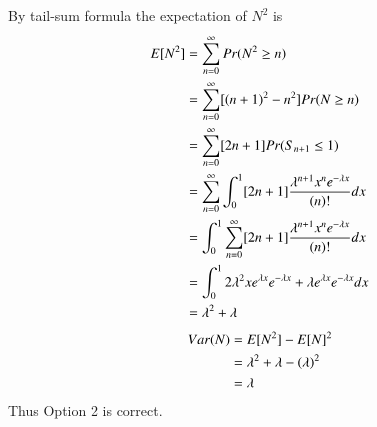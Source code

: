 \documentclass[journal,12pt,twocolumn]{IEEEtran}
\theoremstyle{definition}
\begin{document}
By tail-sum formula the expectation of $N^2$ is\\
\begin{align}
    E[ N^2 ] &= \sum _{n = 0} ^\infty Pr(N^2 \geq n)\\
    &= \sum _{n = 0} ^\infty [(n+1)^2 - n^2] Pr(N \geq n)\\
    &= \sum _{n = 0} ^\infty [2n + 1] Pr(S_{n+1} \leq 1)\\
    &=  \sum _{n = 0} ^\infty \int _0 ^1 [2n+1] \frac{\lambda^{n+1} x^{n}e^{-\lambda x}}{(n)!} dx\\
    &= \int _0 ^1 \sum _{n = 0} ^\infty [2n+1]\frac{\lambda^{n+1} x^{n}e^{-\lambda x}}{(n)!} dx\\
    &= \int _0 ^1 2\lambda^2 x e^{\lambda x} e^{-\lambda x} + \lambda e^{\lambda x} e^{-\lambda x} dx\\
    &= \lambda ^2 + \lambda
\end{align}
\begin{align}
    Var(N) &= E[ N^2 ] - E[ N ]^2\\
    &= \lambda^2 + \lambda - (\lambda)^2\\
    &= \lambda
\end{align}
Thus Option 2 is correct.
\end{document}

